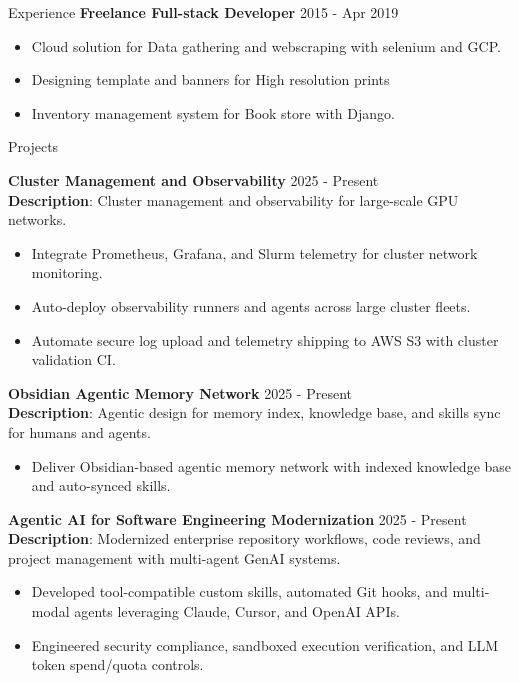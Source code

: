 \documentclass{resume} %
\begin{document}
\begin{rSection}{Experience}
{\textbf{Freelance Full-stack Developer}}   \hfill {2015 - Apr 2019}
\begin{itemize}
    \item Cloud solution for Data gathering and webscraping with selenium and GCP.
    \item Designing template and banners for High resolution prints
    \item Inventory management system for Book store with Django.
\end{itemize}

\end{rSection}


\begin{rSection}{Projects}

{\bf Cluster Management and Observability} \hfill {2025 - Present}\\
\textbf{Description}: Cluster management and observability for large-scale GPU networks.
\begin{itemize}
    \item Integrate Prometheus, Grafana, and Slurm telemetry for cluster network monitoring.
    \item Auto-deploy observability runners and agents across large cluster fleets.
    \item Automate secure log upload and telemetry shipping to AWS S3 with cluster validation CI.
\end{itemize}

{\bf Obsidian Agentic Memory Network} \hfill {2025 - Present}\\
\textbf{Description}: Agentic design for memory index, knowledge base, and skills sync for humans and agents.
\begin{itemize}
    \item Deliver Obsidian-based agentic memory network with indexed knowledge base and auto-synced skills.
\end{itemize}

{\bf Agentic AI for Software Engineering Modernization} \hfill {2025 - Present}\\
\textbf{Description}: Modernized enterprise repository workflows, code reviews, and project management with multi-agent GenAI systems.
\begin{itemize}
    \item Developed tool-compatible custom skills, automated Git hooks, and multi-modal agents leveraging Claude, Cursor, and OpenAI APIs.
    \item Engineered security compliance, sandboxed execution verification, and LLM token spend/quota controls.
\end{itemize}


\end{rSection}
\end{document}
